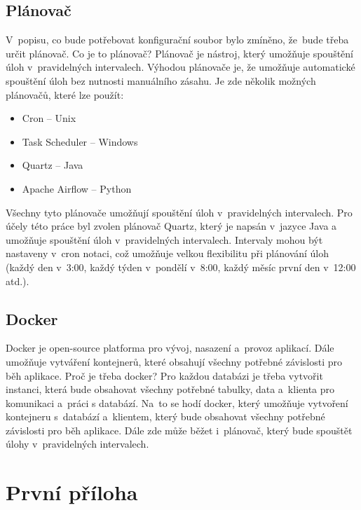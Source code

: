 \documentclass[czech, kiv, ba, he, iso690auyr, pdf]{fasthesis}
\begin{document}
\newpage
\section{Plánovač}
V~popisu, co bude potřebovat konfigurační soubor bylo zmíněno, že~bude třeba určit plánovač.
Co je to plánovač?
Plánovač je nástroj, který umožňuje spouštění úloh v~pravidelných intervalech.
Výhodou plánovače je, že umožňuje automatické spouštění úloh bez nutnosti manuálního zásahu.
Je zde několik možných plánovačů, které lze použít:
\begin{itemize}
    \item Cron -- Unix
    \item Task Scheduler -- Windows
    \item Quartz -- Java
    \item Apache Airflow -- Python
\end{itemize}
Všechny tyto plánovače umožňují spouštění úloh v~pravidelných intervalech.
Pro účely této práce byl zvolen plánovač Quartz, který je napsán v~jazyce Java a 
umožňuje spouštění úloh v~pravidelných intervalech.
Intervaly mohou být nastaveny v~cron notaci, což umožňuje velkou flexibilitu při plánování úloh
(každý den v~3:00, každý týden v~pondělí v~8:00, každý měsíc první den v~12:00 atd.).

\section{Docker}
Docker je open-source platforma pro vývoj, nasazení a~provoz aplikací.
Dále umožňuje vytváření kontejnerů, které obsahují všechny potřebné závislosti pro běh aplikace.
Proč je třeba docker?
Pro každou databázi je třeba vytvořit instanci, která bude obsahovat všechny potřebné tabulky, data 
a~klienta pro komunikaci a~práci s databází. Na~to se hodí docker, který umožňuje vytvoření kontejneru s~databází
a~klientem, který bude obsahovat všechny potřebné závislosti pro běh aplikace.
Dále zde může běžet i~plánovač, který bude spouštět úlohy v~pravidelných intervalech.
\cite{docker}


\appendix
\chapter{První příloha}
\backmatter
\printbibliography
\setbackpageqrcode
\backpage
\end{document}

